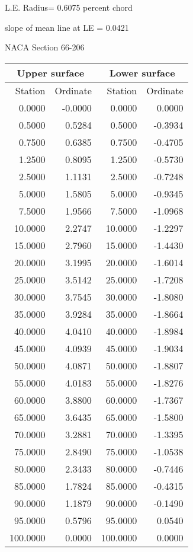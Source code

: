 \documentclass[11pt]{book}
\begin{document}
L.E. Radius=  0.6075 percent chord


 slope of mean line at LE =  0.0421
 \newpage
  \label{s66-206}
 \begin{Large}
 NACA Section 66-206
 \end{Large}
  
 \vspace{8mm}
 \begin{tabular}{|r|r|r|r|} \hline 
 \multicolumn{2}{|c|}{Upper surface} & \multicolumn{2}{|c|}{Lower surface} \\
 \hline
 Station & Ordinate & Station & Ordinate \\
 \hline
0.0000 & -0.0000 & 0.0000 & 0.0000 \\
0.5000 & 0.5284 & 0.5000 & -0.3934 \\
0.7500 & 0.6385 & 0.7500 & -0.4705 \\
1.2500 & 0.8095 & 1.2500 & -0.5730 \\
2.5000 & 1.1131 & 2.5000 & -0.7248 \\
5.0000 & 1.5805 & 5.0000 & -0.9345 \\
7.5000 & 1.9566 & 7.5000 & -1.0968 \\
10.0000 & 2.2747 & 10.0000 & -1.2297 \\
15.0000 & 2.7960 & 15.0000 & -1.4430 \\
20.0000 & 3.1995 & 20.0000 & -1.6014 \\
25.0000 & 3.5142 & 25.0000 & -1.7208 \\
30.0000 & 3.7545 & 30.0000 & -1.8080 \\
35.0000 & 3.9284 & 35.0000 & -1.8664 \\
40.0000 & 4.0410 & 40.0000 & -1.8984 \\
45.0000 & 4.0939 & 45.0000 & -1.9034 \\
50.0000 & 4.0871 & 50.0000 & -1.8807 \\
55.0000 & 4.0183 & 55.0000 & -1.8276 \\
60.0000 & 3.8800 & 60.0000 & -1.7367 \\
65.0000 & 3.6435 & 65.0000 & -1.5800 \\
70.0000 & 3.2881 & 70.0000 & -1.3395 \\
75.0000 & 2.8490 & 75.0000 & -1.0538 \\
80.0000 & 2.3433 & 80.0000 & -0.7446 \\
85.0000 & 1.7824 & 85.0000 & -0.4315 \\
90.0000 & 1.1879 & 90.0000 & -0.1490 \\
95.0000 & 0.5796 & 95.0000 & 0.0540 \\
100.0000 & 0.0000 & 100.0000 & 0.0000 \\
 \hline 
 \end{tabular}
\end{document}
